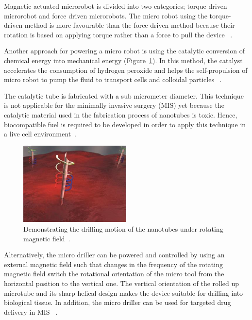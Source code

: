 \documentclass[12pt,a4paper,titlepage]{report}
\begin{document}
Magnetic actuated microrobot is divided into two categories; torque driven microrobot and force
 driven microrobots.
The micro robot using the torque-driven method is more favourable than the force-driven method 
because their rotation is based on applying torque rather than a force to pull the device ~\citep{peyer2013bacteria}.













Another approach for powering a micro robot is using the catalytic conversion of chemical energy
 into mechanical energy (Figure~\ref{nanotube}). In this method, the catalyst accelerates the consumption of hydrogen peroxide
 and helps the self-propulsion of micro robot to pump the fluid to transport cells and colloidal 
particles ~\citep{C2NR32798H}.

The catalytic tube is fabricated with a sub micrometer diameter.
 This technique is not applicable for the minimally invasive surgery (MIS) yet because the catalytic
 material used in the fabrication process of nanotubes is toxic. Hence, biocompatible fuel is required to be developed in order to 
apply this technique in a live cell environment~\citep{C2NR32798H}.


\begin{figure}
  \begin{center}
    \includegraphics[width=0.5\textwidth]{nanoJet3}
  \caption{Demonstrating the drilling motion of the nanotubes under rotating
 magnetic field~\citep{C2NR32798H}.}
  \label{nanotube}
\end{center}
\end{figure}

Alternatively, the micro driller can be powered and controlled by using an external magnetic field 
such that changes in the frequency of the rotating magnetic field switch the rotational orientation of the 
micro tool from the horizontal position to the vertical one. The vertical orientation of the rolled up microtube 
and its sharp helical design makes the device suitable for drilling into biological tissue. In addition, the micro 
driller can be used for targeted drug delivery in MIS ~\citep{C2NR32798H}. 
\end{document}
